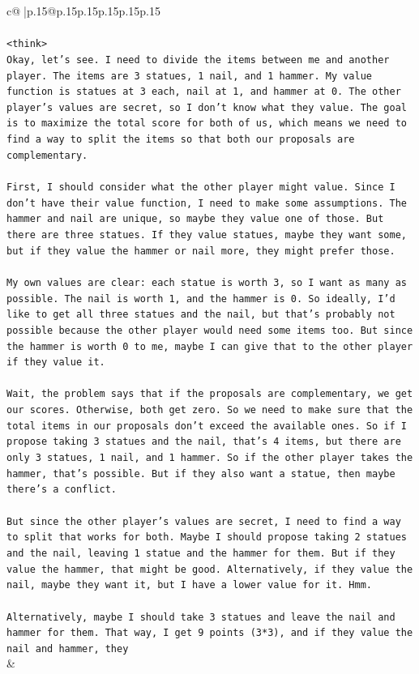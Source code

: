 \documentclass{article}
\begin{document}
{\begin{supertabular}{c@{$\;$}|p{.15\linewidth}@{}p{.15\linewidth}p{.15\linewidth}p{.15\linewidth}p{.15\linewidth}p{.15\linewidth}}
{{{\\ 
\\ 
\texttt{<think>} \\
\texttt{Okay, let's see. I need to divide the items between me and another player. The items are 3 statues, 1 nail, and 1 hammer. My value function is statues at 3 each, nail at 1, and hammer at 0. The other player's values are secret, so I don't know what they value. The goal is to maximize the total score for both of us, which means we need to find a way to split the items so that both our proposals are complementary.} \\
\\ 
\texttt{First, I should consider what the other player might value. Since I don't have their value function, I need to make some assumptions. The hammer and nail are unique, so maybe they value one of those. But there are three statues. If they value statues, maybe they want some, but if they value the hammer or nail more, they might prefer those.} \\
\\ 
\texttt{My own values are clear: each statue is worth 3, so I want as many as possible. The nail is worth 1, and the hammer is 0. So ideally, I'd like to get all three statues and the nail, but that's probably not possible because the other player would need some items too. But since the hammer is worth 0 to me, maybe I can give that to the other player if they value it.} \\
\\ 
\texttt{Wait, the problem says that if the proposals are complementary, we get our scores. Otherwise, both get zero. So we need to make sure that the total items in our proposals don't exceed the available ones. So if I propose taking 3 statues and the nail, that's 4 items, but there are only 3 statues, 1 nail, and 1 hammer. So if the other player takes the hammer, that's possible. But if they also want a statue, then maybe there's a conflict.} \\
\\ 
\texttt{But since the other player's values are secret, I need to find a way to split that works for both. Maybe I should propose taking 2 statues and the nail, leaving 1 statue and the hammer for them. But if they value the hammer, that might be good. Alternatively, if they value the nail, maybe they want it, but I have a lower value for it. Hmm.} \\
\\ 
\texttt{Alternatively, maybe I should take 3 statues and leave the nail and hammer for them. That way, I get 9 points (3*3), and if they value the nail and hammer, they} \\
            }
        }
    }
    & \\ \\


\end{supertabular}}
\end{document}
